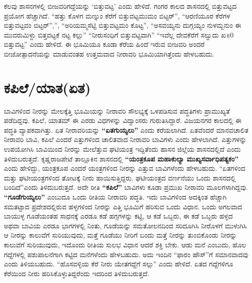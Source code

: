 ಕೆಲವು ಶಾಸನಗಳಲ್ಲಿ ಬೀಜವರಿಗದ್ದೆಯನ್ನು ‘ಬಿತ್ತುವಟ್ಟ’ ಎಂದು ಹೇಳಿದೆ. ಗಂಗರ ಕಾಲದ ಶಾಸನದಲ್ಲಿ ಬಿತ್ತುವಟ್ಟದ ಪ್ರಯೋಗ ಹೆಚ್ಚಾಗಿದೆ. “ಹತ್ತು ಕೊಳಗ ಮಣ್ನುಂ ಕೆರೆಗೆ ಬಿತ್ತುವಟ್ಟಮುಮಂ ಬಿಟ್ಟರ್​”, “ಆರಣಿಯೂರ ಕೆರೆಗಳ ಬಿತ್ತುವಟ್ಟವಂ ಬಿಟ್ಟರ್​”,”, “ಅರಿಯಮ್ಮಸೆಟ್ಟಿ ಬಿತ್ತುವಟ್ಟಮಂ ಕೊಟ್ಟ”, “ಅಸವಯ್ಯನು ದುಗ್ಗಯ್ಯಂ ನುಳಮ್ಬನುಂ ಈ ಮುವರುಮಿಳ್ದು ಬಿತ್ತವಟ್ಟಕೆ ನಟ್ಟ ಕಲ್ಲು” “ನೀರುಸಂಧಿಗೆ ಬಿತ್ತುವಟ್ಟವಾಗಿ” “ಇವೆಲ್ಲ ದೇವಕೆರೆಗೆ ಸಲ್ವುದು ಖ॥0 ಬಿತ್ತುವಟ್ಟ” ಎಂದು ಹೇಳಿದೆ. ಈ ಭೂಮಿಯೂ ಕೂಡಾ ಕೆರೆಯ ಹಿಂದೆ ಇರುವ ಬೀಜವರಿ ಅಂದರೆ ಬೀಜೋತ್ಪಾದನೆಯನ್ನು ಮಾಡುವಂತಹ ಉತ್ತಮವಾದ ನೀರಾವರಿ ಭೂಮಿಯಾಗಿತ್ತೆಂದು ಹೇಳಬಹುದು.


\section{ಕಪಿಲೆ/ಯಾತ(ಏತ)}

ಬಾವಿಗಳಿಂದ ನೀರನ್ನು ಮೇಲಕ್ಕೆತ್ತಿ ಭೂಮಿಯನ್ನು ನೀರಾವರಿ ಸೌಲಭ್ಯಕ್ಕೆ ಒಳಪಡಿಸುವ ಪದ್ಧತಿಗಳು ಪ್ರಾಮುಖ್ಯತೆ ಪಡೆದಿದ್ದವು. ಕಪಿಲೆ, ಯಾತಮ್ ಈ ಎರಡು ವಿಧಗಳನ್ನು ವಿದ್ವಾಂಸರು ಗುರುತಿಸಿದ್ದಾರೆ. ವಿಜಯನಗರ ಕಾಲದಲ್ಲಿ ಈ ಪದ್ಧತಿ ವ್ಯಾಪಕವಾಗಿತ್ತು. ಏತ ನೀರಾವರಿಯನ್ನು \textbf{“ಏತಗುಯ್ಯಲು”} ಎಂದು ಕರೆಯಲಾಗಿದೆ. ಏತವೆಂದರೆ ಮಾನವಚಾಲಿತ ನೀರಾವರಿ ಬಾವಿ, ಕಪಿಲೆ ಎಂದರೆ ಎತ್ತುಗಳಿಂದ ಚಾಲಿತವಾದ ನೀರಾವರಿ ಬಾವಿಗಳು ಎಂದು ಹೇಳಲಾಗಿದೆ. ಎತ್ತುಗಳನ್ನು ಉಪಯೋಗಿಸಿ ಬಾವಿಯಿಂದ ನೀರನ್ನು ಮೇಲೆತ್ತುವ ಘಟಿಯಂತ್ರ ಇದ್ದಿತೆಂದು ಹಾಸನ ಜಿಲ್ಲೆಯ ಶಾಸನದಲ್ಲಿದೆ ಎಂದು ತಿಳಿದುಬರುತ್ತದೆ. ಕೃಷ್ಣರಾಜಪೇಟೆ ತಾಲ್ಲೂಕಿನ ಶಾಸನದಲ್ಲಿ \textbf{“ಯಂತ್ರಕೂಪ ಮಹಾಕುಲ್ಯಾ ಮುಖ್ಯಸರ್ವಾಧಿಪತ್ಯಕಂ”} ಎಂದು ಹೇಳಿದ್ದು, ಯಂತ್ರಕೂಪ ಎಂದರೆ ಯಂತ್ರಗಳಿಂದ ನೀರನ್ನು ಎತ್ತುವ ಬಾವಿಗಳೆಂದು ಹೇಳಬಹುದು. “ಏತಗಳಿಂದ ಮತ್ತು ಘಟೀಯಂತ್ರಗಳಿಂದ ತೋಟಕ್ಕೆ ನೀರು ಹಾಯಿಸುತ್ತಿದ್ದರು. ಘಟೀಯಂತ್ರದ ವರ್ಣನೆಯು ಒಂದು ಶಾಸನದಲ್ಲಿ ಬಂದಿದೆ”ಎಂದು ತಿಳಿದುಬರುತ್ತದೆ. ಅದೇ ರೀತಿ \textbf{“ಕಪಿಲೆ” }ಬಾವಿಗಳು ಕೂಡಾ ಪ್ರಮುಖ ನೀರಾವರಿ ಮೂಲಗಳಾಗಿದ್ದವು. \textbf{“ಗೂಡೆಗುಯ್ಯಲು”} ಎಂಬುದೂ ಒಂದು ರೀತಿಯ ನೀರಾವರಿ ಪದ್ಧತಿ. ಇದು ಬಾವಿಗಳಿಂದ ಅದಕ್ಕಿಂತ ಹೆಚ್ಚಾಗಿ ಸಮತಟ್ಟಾದ ಪ್ರದೇಶದಲ್ಲಿರುವ ಹಳ್ಳಗಳಿಂದ ನೀರನ್ನು ಎತ್ತಿ ಭೂಮಿಗೆ ಹರಿಸುವ ಒಂದು ವಿಧಾನ. ಒಂದು ಅಗಲವಾದ ಬಾಯುಳ್ಳ ಗೂಡೆಯಂತಹ ಸಾಧನಕ್ಕೆ ಎರಡೂ ಕಡೆ ಹಗ್ಗಗಳನ್ನು ಕಟ್ಟಿ, ಆ ಕಡೆ ಒಬ್ಬರು, ಈ ಕಡೆ ಒಬ್ಬರು ಹಳ್ಳದ ಅಥವಾ ಬಾವಿಯ ಎರಡೂ ಭಾಗಗಳಲ್ಲಿ ನಿಂತು, ಗೂಡೆಯನ್ನು ಸಮತೋಲನದಿಂದ ಸರಿದೂಗಿಸಿ ನೀರೊಳಗೆ ಮುಳುಗಿಸಿ ಆ ನೀರನ್ನು ಕಾಲುವೆಗೆ ಸುರಿಯುವುದು, ಮತ್ತೆ ಗೂಡೆಯು ನೀರಿಗೆ ಬಂದು ಮತ್ತೆ ನೀರನ್ನು ತುಂಬಿಕೊಂಡು ನೀರನ್ನು ಕಾಲುವೆಗೆ ಸುರಿಯುವುದು, ಇದೊಂದು ರೀತಿಯ ಸುಲಭ ವಿಧಾನ ಆದರೆ ಶಕ್ತಿ ಬೇಕು. ಆಡು ಮನೆ ಎಂಬುದು, ಹೊಲ ಗದ್ದೆಗಳಲ್ಲಿ ಪಶುಪಾಲನೆಗಾಗಿ ಕಟ್ಟಿದ ಮನೆಗಳೆಂದು ಹೇಳಬಹುದು. ಅದು ಇಂದಿನ “ಫಾರಂ ಹೌಸ್​”ಗೆ ಸಮಾನವಾದವು ಎಂದು ತಿಳಿಯಬಹುದು. “ಹೊಸವಳ್ಳಿಯ ಕೆರೆ ನೀರು ಯೇತಗದ್ದೆಗೆ ಸಲ್ಗು” ಎಂದು ಹೇಳಿದೆ. ಏತದ ಗದ್ದೆಗಳಿಗೂ ಕೆರೆಯಿಂದ ನೀರು ಹರಿಸಿಕೊಳ್ಳುತಿದ್ದರೆಂದು ಇದರಿಂದ ತಿಳಿದುಬರುತ್ತದೆ.


